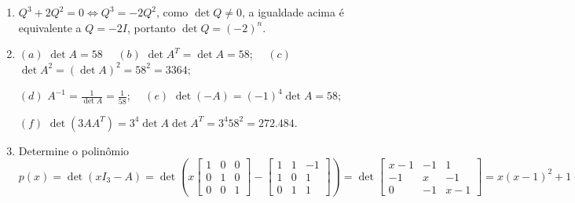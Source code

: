 \documentclass{report}
\begin{document}
\begin{enumerate}
$(d)$ $(AB)^{-1}= \left[
\begin{array}{rrrr}
-\frac{1}{3} & -\frac{5}{6} & -\frac{17}{24} & \frac{31}{36} \\
& & & \\
-\frac{1}{4} & -\frac{3}{3} & -\frac{5}{8} & \frac{3}{4} \\
& & & \\
-\frac{7}{6} & -\frac{19}{6} & -\frac{35}{12} & \frac{55}{18} \\
& & & \\
-\frac{25}{24} & -\frac{67}{24} & -\frac{119}{48} & \frac{187}{72}
\end{array}
\right];$ \ \  $(e)$ $\det C =16.$


\item  $Q^3 +2 Q^2 =0 \Leftrightarrow Q^3 = -2Q^2$, como $\det Q
\ne 0$, a igualdade acima é equivalente a $Q =-2I$, portanto $\det
Q = (-2)^n$.



\item $(a)$ $\det A = 58$ \ \ $(b)$ $\det A^T =\det A = 58$; \ \
$(c)$ $\det A^2 = (\det A)^2 = 58^2 = 3364$;

$(d)$ $A^{-1}= \frac{1}{\det A}= \frac{1}{58}$;  \ \ $(e)$ $\det(
-A) = (-1)^4 \det A = 58$;

$(f)$ $\det(3AA^T)=3^4\det A \det A^T = 3^4 58^2 = 272.484$.


\item  Determine o polinômio $p(x)=\det (xI_3 -A) =
\det\left(x\left[
\begin{array}{rrr}
1 & 0 & 0 \\
0 & 1 & 0 \\
0 & 0 & 1
\end{array}
\right] - \left[
\begin{array}{rrr}
1 & 1 & -1 \\
1 & 0 & 1 \\
0 & 1 & 1
\end{array}
\right] \right)= \det \left[
\begin{array}{rrr}
x-1 & -1 & 1 \\
-1 & x & -1 \\
0 & -1 & x-1
\end{array}
\right] = x(x-1)^2+1-2(x-1)=x^3-2x^2-x+3.$


\end{enumerate}
\end{document}
